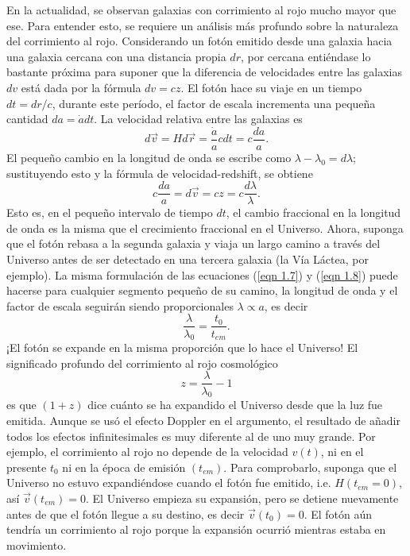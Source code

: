 \documentclass[a4paper,openright,12pt]{book}
\begin{document}
En la actualidad, se observan galaxias con corrimiento al rojo mucho mayor que ese. Para entender esto, se requiere un análisis más profundo sobre la naturaleza del corrimiento al rojo. Considerando un fotón emitido desde una galaxia hacia una galaxia cercana con una distancia propia $dr$, por cercana entiéndase lo bastante próxima para suponer que la diferencia de velocidades entre las galaxias $dv$ está dada por la fórmula $dv = cz$. El fotón hace su viaje en un tiempo $dt = dr/c$, durante este período, el factor de escala incrementa una pequeña cantidad $da = \dot{a} dt$. La velocidad relativa entre las galaxias es
\begin{equation}
d\vec{v}=Hd\vec{r}=\frac{\dot{a}}{a}cdt=c\frac{da}{a}.\label{eqn 1.7}
\end{equation}
El pequeño cambio en la longitud de onda se escribe como $ \lambda - \lambda_{0} = d\lambda$; sustituyendo esto y la fórmula de velocidad-redshift, se obtiene
\begin{equation}
c\frac{da}{a}=d\vec{v}=cz=c\frac{d\lambda}{\lambda}.\label{eqn 1.8}
\end{equation}
Esto es, en el pequeño intervalo de tiempo $dt$, el cambio fraccional en la longitud de onda es la misma que el crecimiento fraccional en el Universo. Ahora, suponga que el fotón rebasa a la segunda galaxia y viaja un largo camino a través del Universo antes de ser detectado en una tercera galaxia (la Vía Láctea, por ejemplo). La misma formulación de las ecuaciones (\ref{eqn 1.7}) y (\ref{eqn 1.8}) puede hacerse para cualquier segmento pequeño de su camino, la longitud de onda y el factor de escala seguirán siendo proporcionales $\lambda \propto a$, es decir
\begin{equation}
\frac{\lambda}{\lambda_{0}}= \frac{t_{0}}{t_{em}}.\label{eqn 1.9}
\end{equation}
¡El fotón se expande en la misma proporción que lo hace el Universo! El significado profundo del corrimiento al rojo cosmológico
\begin{equation}
z = \frac{\lambda}{\lambda_{0}} - 1\label{eqn 1.10}
\end{equation} 
es que $(1+z)$ dice cuánto se ha expandido el Universo desde que la luz fue emitida. Aunque se usó el efecto Doppler en el argumento, el resultado de añadir todos los efectos infinitesimales es muy diferente al de uno muy grande. Por ejemplo, el corrimiento al rojo no depende de la velocidad $v(t)$, ni en el presente $t_{0}$ ni en la época de emisión $(t_{em})$. Para comprobarlo, suponga que el Universo no estuvo expandiéndose cuando el fotón fue emitido, i.e. $H(t_{em}=0)$, así $\vec{v}(t_{em})=0$. El Universo empieza su expansión, pero se detiene nuevamente antes de que el fotón llegue a su destino, es decir $\vec{v}(t_{0})=0$. El fotón aún tendría un corrimiento al rojo porque la expansión ocurrió mientras estaba en movimiento.
\end{document}
